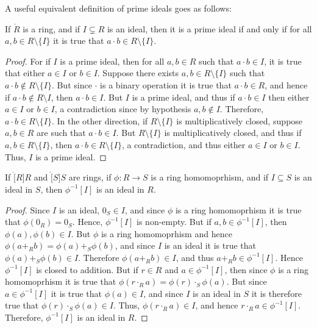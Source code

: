     A useful equivalent definition of prime ideals goes as follows:
    \begin{theorem}
        If $\ring{R}$ is a ring, and if $I\subsetneq{R}$ is an ideal, then
        it is a prime ideal if and only if for all $a,b\in{R}\setminus\{I\}$
        it is true that $a\cdot{b}\in{R}\setminus\{I\}$.
    \end{theorem}
    \begin{proof}
        For if $I$ is a prime ideal, then for all $a,b\in{R}$ such that
        $a\cdot{b}\in{I}$, it is true that either $a\in{I}$ or $b\in{I}$.
        Suppose there exists $a,b\in{R}\setminus\{I\}$ such that
        $a\cdot{b}\notin{R}\setminus\{I\}$. But since $\cdot$ is a binary
        operation it is true that $a\cdot{b}\in{R}$, and hence if
        $a\cdot{b}\notin{R}\setminus{I}$, then $a\cdot{b}\in{I}$. But $I$ is
        a prime ideal, and thus if $a\cdot{b}\in{I}$ then either $a\in{I}$
        or $b\in{I}$, a contradiction since by hypothesis $a,b\notin{I}$.
        Therefore, $a\cdot{b}\in{R}\setminus\{I\}$. In the other direction,
        if $R\setminus\{I\}$ is multiplicatively closed, suppose $a,b\in{R}$
        are such that $a\cdot{b}\in{I}$. But $R\setminus\{I\}$ is
        multiplicatively closed, and thus if $a,b\in{R}\setminus\{I\}$, then
        $a\cdot{b}\in{R}\setminus\{I\}$, a contradiction, and thus either
        $a\in{I}$ or $b\in{I}$. Thus, $I$ is a prime ideal.
    \end{proof}
    \begin{theorem}
        \label{thm:homo_pre_image_of_ideal_is_ideal}%
        If $\ring[R]{R}$ and $\ring[S]{S}$ are rings, if
        $\phi:R\rightarrow{S}$ is a ring homomoprhism, and if
        $I\subseteq{S}$ is an ideal in $S$, then $\phi^{\minus{1}}[I]$ is an
        ideal in $R$.
    \end{theorem}
    \begin{proof}
        Since $I$ is an ideal, $0_{S}\in{I}$, and since $\phi$ is a ring
        homomoprhism it is true that $\phi(0_{R})=0_{S}$. Hence,
        $\phi^{\minus{1}}[I]$ is non-empty. But if
        $a,b\in\phi^{\minus{1}}[I]$, then $\phi(a),\phi(b)\in{I}$. But
        $\phi$ is a ring homomoprhism and hence
        $\phi(a+_{R}b)=\phi(a)+_{S}\phi(b)$, and since $I$ is an ideal it is
        true that $\phi(a)+_{S}\phi(b)\in{I}$. Therefore
        $\phi(a+_{R}b)\in{I}$, and thus $a+_{R}b\in\phi^{\minus{1}}[I]$.
        Hence $\phi^{\minus{1}}[I]$ is closed to addition. But if $r\in{R}$
        and $a\in\phi^{\minus{1}}[I]$, then since $\phi$ is a ring
        homomoprhism it is true that
        $\phi(r\cdot_{R}a)=\phi(r)\cdot_{S}\phi(a)$. But since
        $a\in\phi^{\minus{1}}[I]$ it is true that $\phi(a)\in{I}$, and since
        $I$ is an ideal in $S$ it is therefore true that
        $\phi(r)\cdot_{S}\phi(a)\in{I}$. Thus, $\phi(r\cdot_{R}a)\in{I}$,
        and hence $r\cdot_{R}a\in\phi^{\minus{1}}[I]$. Therefore,
        $\phi^{\minus{1}}[I]$ is an ideal in $R$.
    \end{proof}
